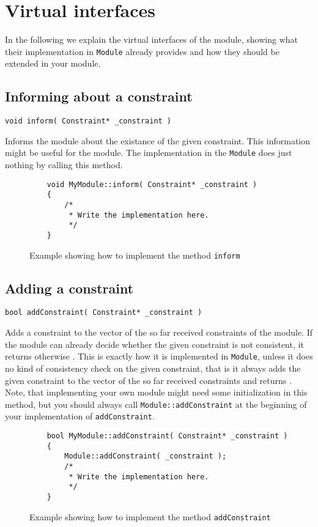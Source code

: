 \section{Virtual interfaces}
In the following we explain the virtual interfaces
of the module, showing what their implementation in \texttt{Module} already
provides and how they should be extended in your module.

\subsection{Informing about a constraint}
\begin{verbatim}void inform( Constraint* _constraint )\end{verbatim}
Informs the module about the existance of the given constraint. This information might
be useful for the module. The implementation in the \texttt{Module} does just nothing by calling
this method.

\begin{figure}[htb]
\label{fig:exa_inform}
\caption{Example showing how to implement the method \texttt{inform}}
\begin{verbatim}
	void MyModule::inform( Constraint* _constraint )
	{
	    /*
	     * Write the implementation here.
	     */
	}
\end{verbatim}
\end{figure}

\subsection{Adding a constraint}
\begin{verbatim}bool addConstraint( Constraint* _constraint )\end{verbatim}
Adds a constraint to the vector of the so far received constraints of the module. If the module
can already decide whether the given constraint is not consistent, it returns \false
otherwise \true. This is exactly how it is implemented in \texttt{Module}, unless
it does no kind of consistency check on the given constraint, that is it always adds the
given constraint to the vector of the so far received constraints and returns \true.
Note, that implementing your own module might need some initialization in this method,
but you should always call \texttt{Module::addConstraint} at the beginning of your
implementation of \texttt{addConstraint}.

\begin{figure}[htb]
\label{fig:exa_addconstraint}
\caption{Example showing how to implement the method \texttt{addConstraint}}
\begin{verbatim}
	bool MyModule::addConstraint( Constraint* _constraint )
	{
	    Module::addConstraint( _constraint );
	    /*
	     * Write the implementation here.
	     */
	}
\end{verbatim}
\end{figure}

